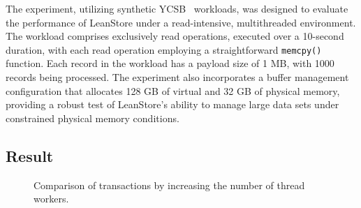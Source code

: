 The experiment, utilizing synthetic YCSB~\parencite{cooper2010benchmarking} workloads, was designed to evaluate the performance of LeanStore under a read-intensive, multithreaded environment. The workload comprises exclusively read operations, executed over a 10-second duration, with each read operation employing a straightforward \texttt{memcpy()} function. Each record in the workload has a payload size of 1 MB, with 1000 records being processed. The experiment also incorporates a buffer management configuration that allocates 128 GB of virtual and 32 GB of physical memory, providing a robust test of LeanStore's ability to manage large data sets under constrained physical memory conditions.

\subsection{Result}

\begin{figure}[H]
    \centering
    \caption{Comparison of transactions by increasing the number of thread workers.}
    \label{fig:txn_comparison}
\end{figure}

